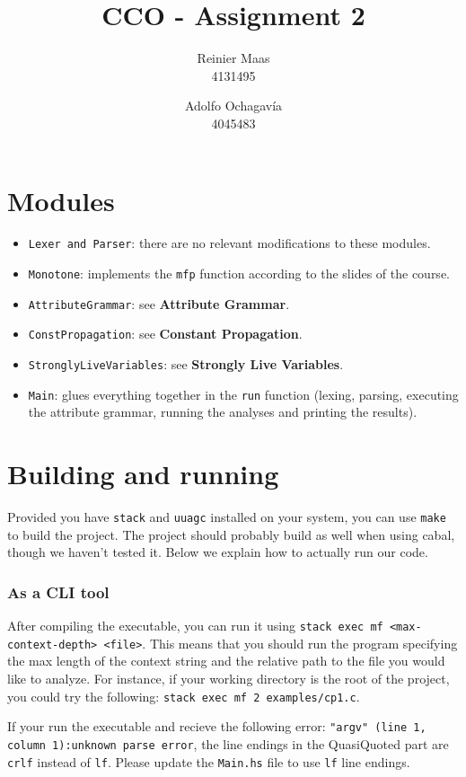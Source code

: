 \documentclass{article}
\author{
  Reinier Maas \\ 4131495
  \and
  Adolfo Ochagavía \\ 4045483
}
\title{CCO - Assignment 2}
\begin{document}
\maketitle

\section*{Modules}

\begin{itemize}
\item \texttt{Lexer and Parser}: there are no relevant modifications to these modules.
\item \texttt{Monotone}: implements the \texttt{mfp} function according to the slides of the course.
\item \texttt{AttributeGrammar}: see \textbf{Attribute Grammar}.
\item \texttt{ConstPropagation}: see \textbf{Constant Propagation}.
\item \texttt{StronglyLiveVariables}: see \textbf{Strongly Live Variables}.
\item \texttt{Main}: glues everything together in the \texttt{run} function (lexing, parsing, executing the attribute grammar, running the analyses and printing the results).
\end{itemize}

\section*{Building and running}

Provided you have \texttt{stack} and \texttt{uuagc} installed on your system, you can use \texttt{make} to build the project.
The project should probably build as well when using cabal, though we haven't tested it.
Below we explain how to actually run our code.

\subsubsection*{As a CLI tool}

After compiling the executable, you can run it using \texttt{stack exec mf <max-context-depth> <file>}.
This means that you should run the program specifying the max length of the context string and the relative path to the file you would like to analyze.
For instance, if your working directory is the root of the project, you could try the following: \texttt{stack exec mf 2 examples/cp1.c}.

If your run the executable and recieve the following error: \texttt{"argv" (line 1, column 1):unknown parse error}, the line endings in the QuasiQuoted part are \texttt{crlf} instead of \texttt{lf}.
Please update the \texttt{Main.hs} file to use \texttt{lf} line endings.
\end{document}
